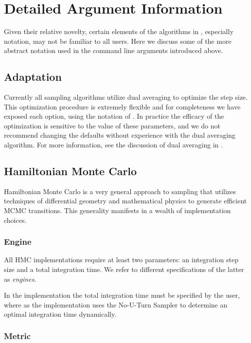 \section{Detailed Argument Information}

Given their relative novelty, certain elements of the algorithms in \Stan,
especially notation, may not be familiar to all users.  Here we discuss
some of the more abstract notation used in the command line arguments
introduced above.

\subsection{Adaptation}

Currently all \Stan sampling algorithms utilize dual averaging to
optimize the step size.  This optimization procedure is extremely
flexible and for completeness we have exposed each option,
using the notation of \citep{Hoffman-Gelman:2011, Hoffman-Gelman:2013}.
In practice the efficacy of the optimization is sensitive to the
value of these parameters, and we do not recommend
changing the defaults without experience with the dual averaging
algorithm.  For more information, see the discussion of dual averaging
in \citep{Hoffman-Gelman:2011, Hoffman-Gelman:2013}.

\subsection{Hamiltonian Monte Carlo}

Hamiltonian Monte Carlo is a very general approach to sampling that
utilizes techniques of differential geometry and mathematical physics
to generate efficient MCMC transitions.  This generality manifests in
a wealth of implementation choices.

\subsubsection{Engine}

All HMC implementations require at least two parameters: an
integration step size and a total integration time.  We refer to
different specifications of the latter as \textit{engines}.

In the  implementation the total integration time
must be specified by the user, where as the 
implementation uses the No-U-Turn Sampler to determine
an optimal integration time dynamically. 

\subsubsection{Metric}

